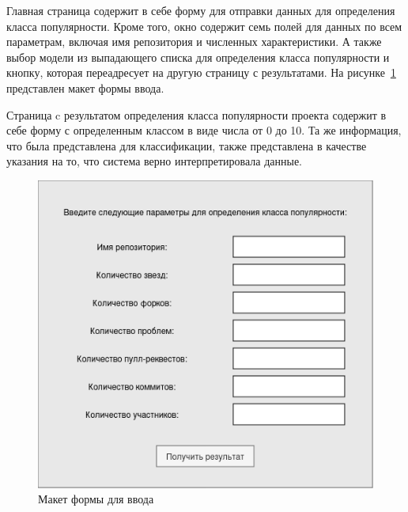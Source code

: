 Главная страница содержит в себе форму для отправки данных для определения класса популярности. Кроме того, окно содержит семь полей для данных по всем параметрам, включая имя репозитория и численных характеристики. А также выбор модели из выпадающего списка для определения класса популярности и кнопку, которая переадресует на другую страницу с результатами. На рисунке~\ref{ris:sketch} представлен макет формы ввода.

Страница c результатом определения класса популярности проекта содержит в себе форму с определенным классом в виде числа от 0 до 10. Та же информация, что была представлена для классификации, также представлена в качестве указания на то, что система верно интерпретировала данные.

 \fxnote{} 

\begin{center}
    \begin{figure}[H]
        \includegraphics[scale=0.7]{pic/sketch-form.png}
        \caption{Макет формы для ввода}
        \label{ris:sketch}
    \end{figure}
\end{center}
\vspace{1.5em}